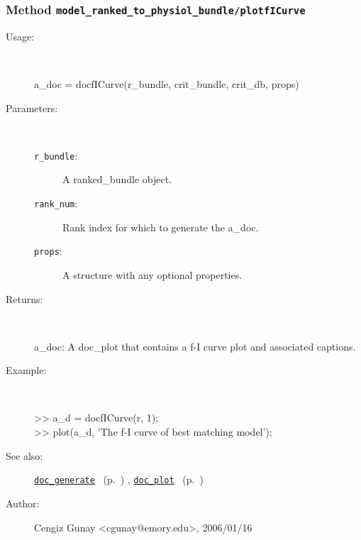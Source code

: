 \subsubsection[Method \texttt{plotfICurve}]{Method \texttt{model\_ranked\_to\_physiol\_bundle/plotfICurve}}%
%
\label{ref_model_ranked_to_physiol_bundle__plotfICurve}%
\hypertarget{ref_model_ranked_to_physiol_bundle__plotfICurve}{}%
\begin{description}
%
\item[Usage:]~%
\begin{lyxcode}%
a\_doc = docfICurve(r\_bundle, crit\_bundle, crit\_db, props)
%
\end{lyxcode}%
%
%
\item[Parameters:]~
\begin{description}%
\item[\texttt{r\_bundle}:]
 A ranked\_bundle object.
\item[\texttt{rank\_num}:]
 Rank index for which to generate the a\_doc.
\item[\texttt{props}:]
 A structure with any optional properties.
\end{description}%
%
\item[Returns:]~

	a\_doc: A doc\_plot that contains a f-I curve plot and associated captions.
%
\item[Example:]~
\begin{lyxcode} >> a\_d = docfICurve(r, 1);\\%
 >> plot(a\_d, 'The f-I curve of best matching model');\\%
\end{lyxcode}
%
\item[See also:]%
\hyperlink{ref_doc_generate}{\texttt{doc\_generate}}%
\ (p.~\pageref{ref_doc_generate})%
%
, \hyperlink{ref_doc_plot}{\texttt{doc\_plot}}%
\ (p.~\pageref{ref_doc_plot})%
%
%
\item[Author:]%
Cengiz Gunay <cgunay@emory.edu>, 2006/01/16%
\end{description}
\methodline%
